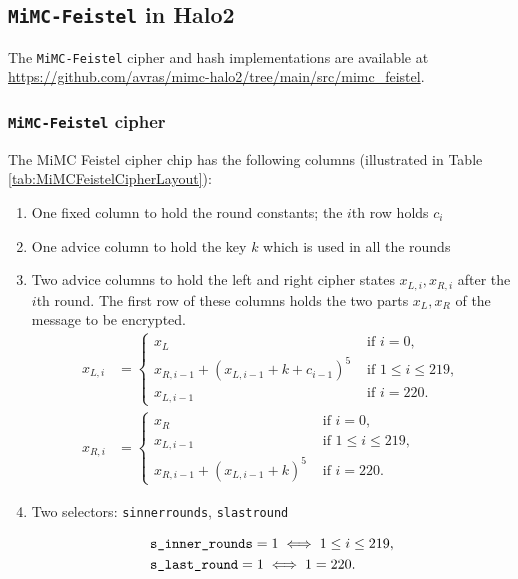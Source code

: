 \documentclass[10pt]{article}
\begin{document}
\subsection{\texttt{MiMC-Feistel} in Halo2}%
\label{subsec:mimc_feistel_in_halo2}
The \texttt{MiMC-Feistel} cipher and hash implementations are available at \url{https://github.com/avras/mimc-halo2/tree/main/src/mimc_feistel}.
\subsubsection{\texttt{MiMC-Feistel} cipher}
The MiMC Feistel cipher chip has the following columns (illustrated in Table \ref{tab:MiMCFeistelCipherLayout}):
\begin{enumerate}
  \item One fixed column to hold the round constants; the $i$th row holds $c_i$
  \item One advice column to hold the key $k$ which is used in all the rounds
  \item Two advice columns to hold the left and right cipher states $x_{L,i}, x_{R,i}$ after the $i$th round. The first row of these columns holds the two parts $x_L, x_R$ of the message to be encrypted.
    \begin{align*}
      x_{L,i} &= 
      \begin{cases}
        x_L & \text{ if } i = 0,\\
        x_{R, i-1} + \left( x_{L,i-1}+k+c_{i-1}\right)^5  & \text{ if } 1 \le i \le  219,\\
        x_{L,i-1}  & \text{ if } i=220.
      \end{cases}\\
      x_{R,i} &= 
      \begin{cases}
        x_R & \text{ if } i = 0,\\
         x_{L,i-1} & \text{ if } 1 \le i \le  219,\\
         x_{R,i-1} + \left( x_{L,i-1}+k\right)^5  & \text{ if } i=220.
      \end{cases}
    \end{align*}
  \item Two selectors: \texttt{s\textunderscore inner\textunderscore rounds}, \texttt{s\textunderscore last\textunderscore round}

    \begin{align*}
      & \texttt{s\textunderscore inner\textunderscore rounds} = 1  \iff 1 \le i\le 219,\\
      & \texttt{s\textunderscore last\textunderscore round} = 1  \iff 1 = 220.
    \end{align*}
\end{enumerate}
\end{document}
